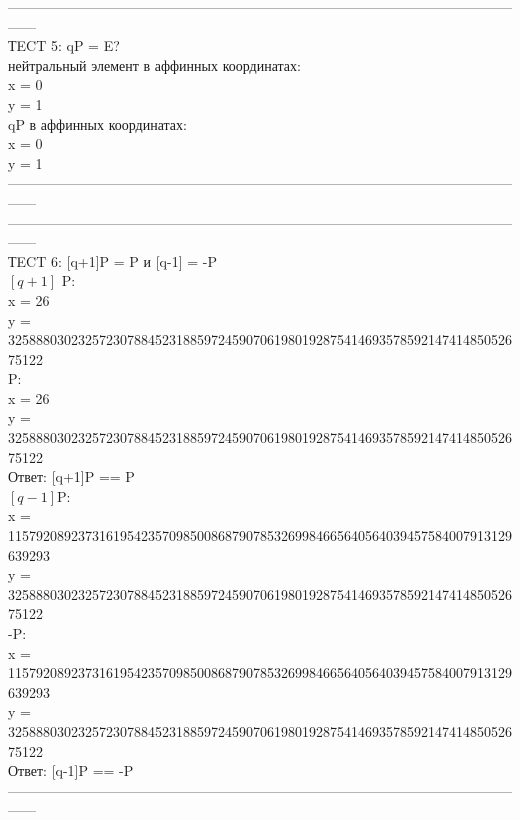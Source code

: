 \documentclass[a4paper,12pt]{article}
\begin{document}
	------------------------------------------------------------------------------------------------------------------\\
	ТECT 5: qP = E?\\
	нейтральный элемент в аффинных координатах:\\
	x = 0\\
	y = 1\\
	
	qP в аффинных координатах:\\
	x = 0\\
	y = 1\\
	
	------------------------------------------------------------------------------------------------------------------\\
	
	------------------------------------------------------------------------------------------------------------------\\
	ТECT 6: [q+1]P = P и [q-1] = -P\\
	$[q+1]$ P:\\
	x = 26\\
	y = 32588803023257230788452318859724590706198019287541469357859214741485052675122\\
	
	P:\\
	x = 26\\
	y = 32588803023257230788452318859724590706198019287541469357859214741485052675122\\
	
	Ответ: [q+1]P == P\\
	$[q-1]$P:\\
	x = 115792089237316195423570985008687907853269984665640564039457584007913129639293\\
	y = 32588803023257230788452318859724590706198019287541469357859214741485052675122\\
	
	-P:\\
	x = 115792089237316195423570985008687907853269984665640564039457584007913129639293\\
	y = 32588803023257230788452318859724590706198019287541469357859214741485052675122\\
	
	Ответ: [q-1]P == -P\\
	------------------------------------------------------------------------------------------------------------------\\
	
\end{document}
